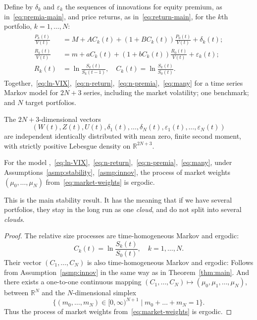 \documentclass[12pt]{amsart}
\begin{document}
Define by $\delta_k$ and $\varepsilon_k$ the sequences of innovations for equity premium, as in~\eqref{eq:premia-main}, and price returns, as in~\eqref{eq:return-main}, for the $k$th portfolio, $k = 1, \ldots, N$:
\begin{align}
\label{eq:many}
\begin{split}
\frac{P_k(t)}{V(t)} &= M + AC_k(t) + (1 + BC_k(t))\frac{P_0(t)}{V(t)} + \delta_k(t);\\
\frac{R_k(t)}{V(t)} &= m + aC_k(t) + (1 + bC_k(t))\frac{R_0(t)}{V(t)} + \varepsilon_k(t);\\
R_k(t) &= \ln\frac{S_k(t)}{S_k(t-1)},\quad C_k(t) = \ln\frac{S_k(t)}{S_0(t)}.
\end{split}
\end{align}
Together,~\eqref{eq:ln-VIX},~\eqref{eq:n-return},~\eqref{eq:n-premia},~\eqref{eq:many} for a time series Markov model for $2N+3$ series, including the market volatility; one benchmark; and $N$ target portfolios. 

\begin{asmp}
The $2N+3$-dimensional vectors 
$$
(W(t), Z(t), U(t), \delta_1(t), \ldots, \delta_N(t), \varepsilon_1(t), \ldots, \varepsilon_N(t))
$$
are independent identically distributed with mean zero, finite second moment, with strictly positive Lebesgue density on $\mathbb R^{2N+3}$.  
\label{asmp:innov}
\end{asmp}

\begin{theorem} For the model ,~\eqref{eq:ln-VIX},~\eqref{eq:n-return},~\eqref{eq:n-premia},~\eqref{eq:many}, under Assumptions~\ref{asmp:stability},~\ref{asmp:innov}, the process of market weights $(\mu_{0}, \ldots, \mu_{N})$ from~\eqref{eq:market-weights} is ergodic. 
\label{thm:weights}
\end{theorem}

This is the main stability result. It has the meaning that if we have several portfolios, they stay in the long run as one {\it cloud}, and do not split into several {\it clouds}.

\begin{proof}
The relative size processes are time-homogeneous Markov and ergodic:
\begin{equation}
\label{eq:rel-sizes}
C_k(t) = \ln\frac{S_k(t)}{S_0(t)},\quad k = 1, \ldots, N.
\end{equation}
Their vector $(C_1, \ldots, C_N)$ is also time-homogeneous Markov and ergodic: Follows from Assumption~\ref{asmp:innov} in the same way as in Theorem~\ref{thm:main}. And there exists a one-to-one continuous mapping $(C_1, \ldots, C_N) \mapsto (\mu_0, \mu_1, \ldots, \mu_N)$, between $\mathbb R^N$ and the $N$-dimensional simplex 
$$
\{(m_0, \ldots, m_N) \in [0, \infty)^{N+1}\mid m_0 + \ldots + m_N = 1\}.
$$
Thus the process of market weights from~\eqref{eq:market-weights} is ergodic. 
\end{proof}
\end{document}
